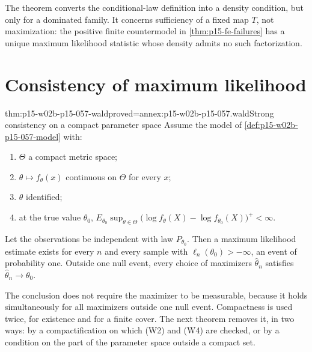 The theorem converts the conditional-law definition into a density
condition, but only for a dominated family. It concerns sufficiency of a
fixed map \(T\), not maximization: the positive finite countermodel in
\cref{thm:p15-fe-failures} has a unique maximum likelihood statistic whose
density admits no such factorization.

\section{Consistency of maximum likelihood}
\label{sec:p15-w02b-p15-057-consistency}

\begin{hbtheorem}{thm:p15-w02b-p15-057-wald}{proved=annex:p15-w02b-p15-057.wald}{Strong consistency on a compact parameter space}
Assume the model of \cref{def:p15-w02b-p15-057-model} with:
\begin{enumerate}
\item[(W1)] \(\Theta\) a compact metric space;
\item[(W2)] \(\theta\mapsto f_\theta(x)\) continuous on \(\Theta\) for
 every \(x\);
\item[(W3)] \(\theta\) identified;
\item[(W4)] at the true value \(\theta_0\),
 \(E_{\theta_0}\sup_{\theta\in\Theta}\bigl(\log f_\theta(X)
 -\log f_{\theta_0}(X)\bigr)^+<\infty\).
\end{enumerate}
Let the observations be independent with law \(P_{\theta_0}\). Then a
maximum likelihood estimate exists for every \(n\) and every sample with
\(\ell_n(\theta_0)>-\infty\), an event of probability one. Outside one null
event, every choice of maximizers \(\widehat\theta_n\) satisfies
\(\widehat\theta_n\to\theta_0\).
\end{hbtheorem}

The conclusion does not require the maximizer to be measurable, because it
holds simultaneously for all maximizers outside one null event. Compactness
is used twice, for existence and for a finite cover. The next theorem
removes it, in two ways: by a compactification on which (W2) and (W4) are
checked, or by a condition on the part of the parameter space outside a
compact set.

